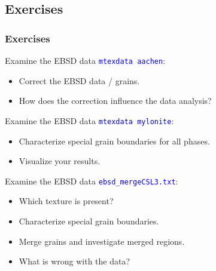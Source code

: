 \subsection{Exercises}
\begin{frame}
  \frametitle{Exercises}

 Examine the EBSD data \textcolor{blue}{\texttt{mtexdata aachen}}:
  \begin{itemize}
  \item Correct the EBSD data / grains.
  \item How does the correction influence the data analysis?
  \end{itemize}

 Examine the EBSD data \textcolor{blue}{\texttt{mtexdata mylonite}}:

  \begin{itemize}
  \item Characterize special grain boundaries for all phases.
  \item Visualize your results.
  \end{itemize}

  Examine the EBSD data \textcolor{blue}{\texttt{ebsd\_mergeCSL3.txt}}:

  \begin{itemize}
  \item Which texture is present?
  \item Characterize special grain boundaries.
  \item Merge grains and investigate merged regions.
  \item What is wrong with the data?
  \end{itemize}


\end{frame}









